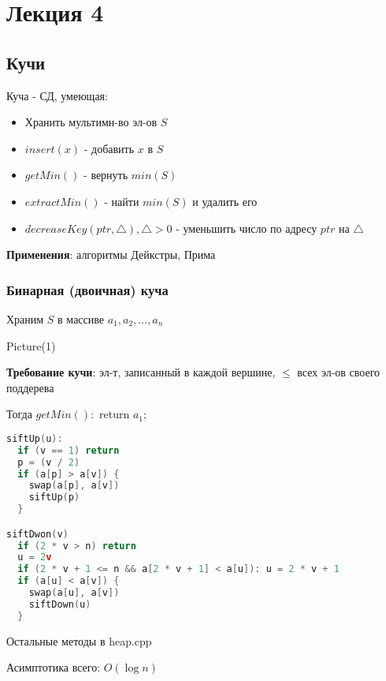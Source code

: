 \section{Лекция 4}
\subsection{Кучи}
\begin{definition}
Куча - СД, умеющая:
\begin{itemize}
  \item Хранить мультимн-во эл-ов $S$
  \item $insert(x)$ - добавить $x$ в $S$
  \item $getMin()$ - вернуть $min(S)$
  \item $extractMin()$ - найти $min(S)$ и удалить его
  \item $decreaseKey(ptr, \triangle), \triangle > 0$ - уменьшить число по адресу $ptr$ на $\triangle$
\end{itemize}
\textbf{Применения}: алгоритмы Дейкстры, Прима
\end{definition}
\subsubsection{Бинарная (двоичная) куча}
Храним $S$ в массиве $a_1, a_2, \ldots, a_n$

Picture(1)

\textbf{Требование кучи}: эл-т, записанный в каждой вершине, $\leq$ всех эл-ов своего поддерева

Тогда $getMin()\colon$ return $a_1$;

\lstset{style=mystyle}
\begin{lstlisting}[language=C++, caption=siftUp and siftDown]
siftUp(u):
  if (v == 1) return
  p = (v / 2)
  if (a[p] > a[v]) {
    swap(a[p], a[v])
    siftUp(p)
  }

siftDwon(v)
  if (2 * v > n) return
  u = 2v
  if (2 * v + 1 <= n && a[2 * v + 1] < a[u]): u = 2 * v + 1
  if (a[u] < a[v]) {
    swap(a[u], a[v])
    siftDown(u)
  }

\end{lstlisting}
Остальные методы в heap.cpp

Асимптотика всего: $O(\log n)$

